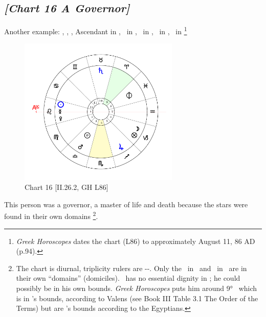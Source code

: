 \newpage
\subsection*{\textit{[Chart 16 A Governor]}}

Another example: \Sun, \Mercury, \Venus, Ascendant in \Leo, \Saturn\, in \Taurus, \Jupiter\, in \Sagittarius, \Mars\, in \Libra, \Moon\, in \Capricorn
\footnote{\textit{Greek Horoscopes} dates the chart (L86) to approximately August 11, 86 AD (p.94).}

\clearpage
\begin{figure}
\centering
\vspace{-20pt}
\includegraphics[width=0.68\textwidth]{charts/2_26_2}
\caption{Chart 16 [II.26.2, GH L86]}
\vspace{-150pt}
\label{fig:chart16}
\end{figure}

This person was a governor, a master of life and death because the stars were found in their own domains
\footnote{The chart is diurnal, triplicity rulers are \Sun-\Jupiter-\Saturn. Only the \Sun\, in \Leo\, and \Jupiter\, in \Sagittarius\, are in their own ``domains'' (domiciles). \Saturn\, has no essential dignity in \Taurus; he could possibly be in his own bounds. \textsl{Greek Horoscopes} puts him around 9° \Taurus\, which is in \Saturn's bounds, according to Valens (see Book III Table 3.1 The Order of the Terms) but are \Mercury's bounds according to the Egyptians.}.

\newpage

